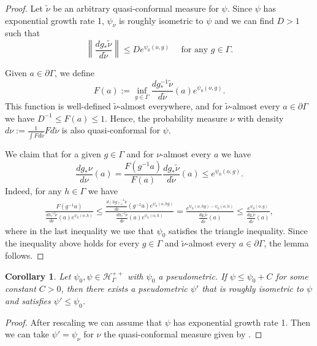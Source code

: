 \documentclass[twoside]{amsart}
\newtheorem{corollary}[theorem]{Corollary}
\theoremstyle{definition}
\numberwithin{equation}{section}
\numberwithin{theorem}{section}
\newcommand{\wtilde}[1]{\widetilde{#1}}
\newcommand{\calH}{\mathcal{H}}
\newcommand{\G}{\Gamma}
\newcommand{\p}{\psi}
\newcommand{\pG}{\partial \G}
\begin{document}
\begin{proof}
Let $\wtilde\nu$ be an arbitrary  quasi-conformal measure for $\p$. Since $\p$ has exponential growth rate 1, $\p_\nu$ is roughly isometric to $\p$ and we can find $D>1$ such that 
\begin{equation*}
    \left\|\frac{dg_\ast\wtilde\nu}{d\wtilde\nu}\right\|\leq De^{\p_0(o,g)} \quad \text{ for any }g\in \G.
\end{equation*}

Given $a\in \pG$, we define \begin{equation*}\label{eq.defdensity}
    F(a):=\inf_{g\in \G}{\frac{dg^{-1}_\ast\wtilde\nu}{d\wtilde\nu}(a)e^{\p_0(o,g)}}.
\end{equation*} This function is well-defined $\wtilde\nu$-almost everywhere, and for $\wtilde\nu$-almost every $a\in \pG$ we have $D^{-1}\leq F(a)\leq 1$. Hence, the probability measure $\nu$ with density $d\nu:=\frac{1}{\int{F}{d\wtilde\nu}}Fd\wtilde\nu$ is also quasi-conformal for $\p$.

We claim that for a given $g\in \G$ and for $\nu$-almost every $a$ we have $$\frac{dg_\ast\nu}{d\nu}(a)= \frac{F(g^{-1}a)}{F(a)}\frac{dg_\ast\wtilde\nu}{d\wtilde\nu}(a)\leq e^{\p_0(o,g)}.$$
Indeed, for any $h\in \G$ we have
\begin{align*}
    \frac{F(g^{-1}a)}{\frac{dh^{-1}_\ast\wtilde\nu}{d\wtilde\nu}(a)e^{\p_0(o,h)}}\leq \frac{\frac{d(hg)^{-1}_\ast\wtilde\nu}{d\wtilde\nu}(g^{-1}a)e^{\p_0(o,hg)}}{\frac{dh^{-1}_\ast\wtilde\nu}{d\wtilde\nu}(a)e^{\p_0(o,h)}}=\frac{e^{\p_0(o,hg)-\p_0(o,h)}}{\frac{dg_\ast\wtilde\nu}{d\wtilde\nu}(a)} \leq \frac{e^{\p_0(o,g)}}{\frac{dg_\ast\wtilde\nu}{d\wtilde\nu}(a)},
\end{align*}
where in the last inequality we use that $\p_0$ satisfies the triangle inequality.
Since the inequality above holds for every $g\in \G$ and $\wtilde\nu$-almost every $a\in \partial \G$, the lemma follows.
\end{proof}

\begin{corollary}\label{coro:improvemetric}
    Let $\p_0,\p\in \calH_\G^{++}$ with $\p_0$ a pseudometric. If $\p\leq \p_0+C$ for some constant $C>0$, then there exists a pseudometric $\p'$ that is roughly isometric to $\p$ and satisfies $\p'\leq \p_0$.
\end{corollary}

\begin{proof}
    After rescaling we can assume that $\p$ has exponential growth rate 1. Then we can take $\p'=\p_\nu$ for $\nu$ the quasi-conformal measure given by .
\end{proof}
\end{document}
